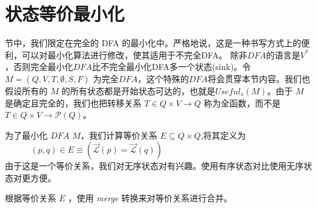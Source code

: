 
\chapter{状态等价最小化}
节中，我们限定在完全的 DFA 的最小化中。严格地说，这是一种书写方式上的便利，可以对最小化算法进行修改，使其适用于不完全DFA。 除非$DFA$的语言是$V^*$，否则完全最小化$DFA$比不完全最小化DFA多一个状态(sink)。令 $ M = (Q,V,T,\emptyset,S,F)$ 为完全$DFA$，这个特殊的$DFA$将会贯穿本节内容。我们也假设所有的 $M$ 的所有状态都是开始状态可达的，也就是$Useful_s(M)$。由于 $M$ 是确定且完全的，我们也把转移关系 $T \in Q \times V \to Q$ 称为全函数，而不是 $T \in Q \times V \to \mathcal{P}(Q)$。

为了最小化 $DFA$ $M$，我们计算等价关系 $E \subseteq Q \times Q$,将其定义为\\
$\mbox{　　　} (p,q) \in E \equiv ( \overrightarrow{\mathcal{L}}(p) = \overrightarrow{\mathcal{L}}(q) )$ \\
由于这是一个等价关系，我们对无序状态对有兴趣。使用有序状态对比使用无序状态对更方便。

根据等价关系 $E$ ，使用 \textit{merge} 转换来对等价关系进行合并。
\newline

